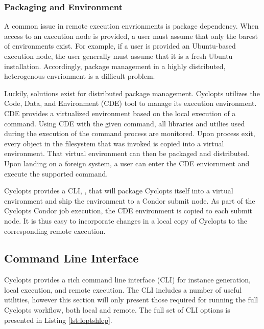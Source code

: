 \subsubsection{Packaging and Environment}

A common issue in remote execution envrionments is package dependency. When
access to an execution node is provided, a user must assume that only the barest
of environments exist. For example, if a user is provided an Ubuntu-based
execution node, the user generally must assume that it is a fresh Ubuntu
installation. Accordingly, package management in a highly distributed,
heterogenous envrionment is a difficult problem.

Luckily, solutions exist for distributed package management. Cyclopts utilizes
the Code, Data, and Environment (CDE) \cite{cde} tool to manage its execution
environment. CDE provides a virtualized environment based on the local execution
of a command. Using CDE with the given command, all libraries and utilies used
during the execution of the command process are monitored. Upon process exit,
every object in the filesystem that was invoked is copied into a virtual
environment. That virtual environment can then be packaged and distributed. Upon
landing on a foreign system, a user can enter the CDE enviornment and execute
the supported command.

Cyclopts provides a CLI, , that will package Cyclopts itself
into a virtual environment and ship the environment to a Condor submit node. As
part of the Cyclopts Condor job execution, the CDE environment is copied to each
submit node. It is thus easy to incorporate changes in a local copy of Cyclopts
to the corresponding remote execution.

\subsection{Command Line Interface}\label{method:tools:cli}

Cyclopts provides a rich command line interface (CLI) for instance generation,
local execution, and remote execution. The CLI includes a number of useful
utilities, however this section will only present those required for running the
full Cyclopts workflow, both local and remote. The full set of CLI options is
presented in Listing \ref{lst:loptshlep}.




